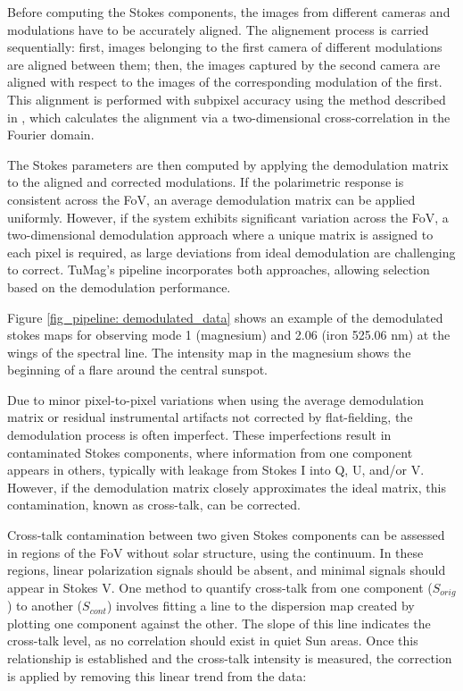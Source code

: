 Before computing the Stokes components, the images from different cameras and modulations have to be accurately aligned. The alignement process is carried sequentially: first, images belonging to the first camera of different modulations are aligned between them; then, the images captured by the second camera are aligned with respect to the images of the corresponding modulation of the first. This alignment is performed with subpixel accuracy using the method described in \cite{alineamiento}, which calculates the alignment via a two-dimensional cross-correlation in the Fourier domain.

The Stokes parameters are then computed by applying the demodulation matrix to the aligned and corrected modulations. If the polarimetric response is consistent across the FoV, an average demodulation matrix can be applied uniformly. However, if the system exhibits significant variation across the FoV, a two-dimensional demodulation approach where a unique matrix is assigned to each pixel is required, as large deviations from ideal demodulation are challenging to correct. TuMag's pipeline incorporates both approaches, allowing selection based on the demodulation performance. 

Figure \ref{fig_pipeline: demodulated_data} shows an example of the demodulated stokes maps for observing mode 1 (magnesium) and 2.06 (iron 525.06 nm) at the wings of the spectral line. The intensity map in the magnesium shows the beginning of a flare around the central sunspot. 

Due to minor pixel-to-pixel variations when using the average demodulation matrix or residual instrumental artifacts not corrected by flat-fielding, the demodulation process is often imperfect. These imperfections result in contaminated Stokes components, where information from one component appears in others, typically with leakage from Stokes I into Q, U, and/or V. However, if the demodulation matrix closely approximates the ideal matrix, this contamination, known as cross-talk, can be corrected.

Cross-talk contamination between two given Stokes components can be assessed in regions of the FoV without solar structure, using the continuum. In these regions, linear polarization signals should be absent, and minimal signals should appear in Stokes V. One method to quantify cross-talk from one component ($S_{orig}$) to another ($S_{cont}$) involves fitting a line to the dispersion map created by plotting one component against the other. The slope of this line indicates the cross-talk level, as no correlation should exist in quiet Sun areas. Once this relationship is established and the cross-talk intensity is measured, the correction is applied by removing this linear trend from the data:

